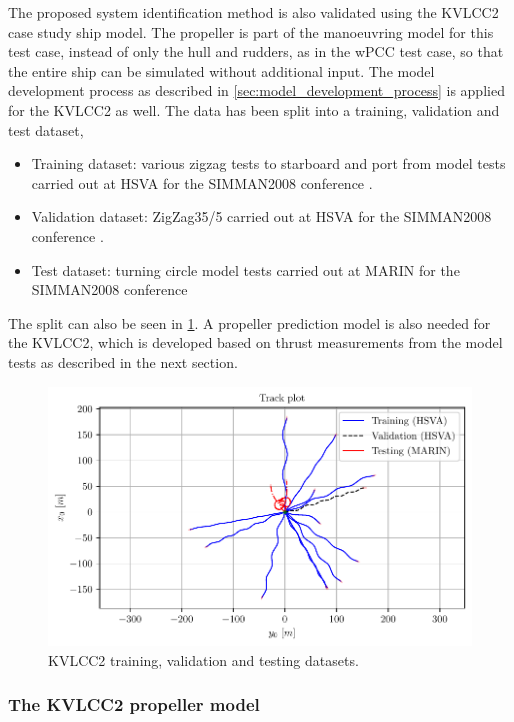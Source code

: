 The proposed system identification method is also validated using the KVLCC2 case study ship model.
The propeller is part of the manoeuvring model for this test case, instead of only the hull and rudders, as in the wPCC test case, so that the entire ship can be simulated without additional input.
The model development process as described in \autoref{sec:model_development_process} is applied for the KVLCC2 as well.
The data has been split into a training, validation and test dataset,
\begin{itemize}
    \item Training dataset: various zigzag tests to starboard and port from model tests carried out at HSVA for the SIMMAN2008 conference \cite{stern_experience_2011}.
    \item Validation dataset: ZigZag35/5 carried out at HSVA for the SIMMAN2008 conference \cite{stern_experience_2011}.
    \item Test dataset: turning circle model tests carried out at MARIN for the SIMMAN2008 conference \cite{stern_experience_2011}
\end{itemize}
\noindent The split can also be seen in \ref{fig:kvlcc2_datasets}. A propeller prediction model is also needed for the KVLCC2, which is developed based on thrust measurements from the model tests as described in the next section.

\begin{figure}[!htb]
\centering
\includegraphics[width=\linewidth]{kappa/images/4.pdf}
\caption{KVLCC2 training, validation and testing datasets.}\label{fig:kvlcc2_datasets}\end{figure}

\newpage
\subsubsection{The KVLCC2 propeller model}
\label{\detokenize{06.20_results_kvlcc2:the-kvlcc2-propeller-model}}\label{\detokenize{06.20_results_kvlcc2:results-propeller-model}}

